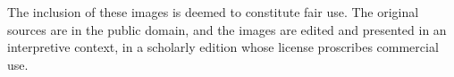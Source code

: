 The inclusion of these images is deemed to constitute fair use. 
The original sources are in the public domain, and the images are 
edited and presented in an interpretive context, 
in a scholarly edition whose license proscribes commercial use.

